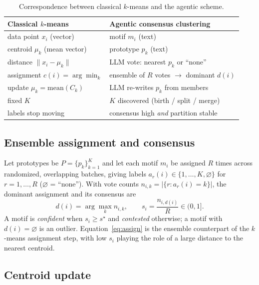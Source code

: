 \begin{table}[t]
\centering
\caption{Correspondence between classical $k$-means and the agentic scheme.}
\label{tab:kmeans}
\begin{tabular}{@{}ll@{}}
\toprule
Classical $k$-means & Agentic consensus clustering \\
\midrule
data point $x_i$ (vector)            & motif $m_i$ (text) \\
centroid $\mu_k$ (mean vector)       & prototype $p_k$ (text) \\
distance $\lVert x_i-\mu_k\rVert$    & LLM vote: nearest $p_k$ or ``none'' \\
assignment $c(i)=\arg\min_k$         & ensemble of $R$ votes $\to$ dominant $d(i)$ \\
update $\mu_k=\mathrm{mean}(C_k)$    & LLM re-writes $p_k$ from members \\
fixed $K$                            & $K$ discovered (birth / split / merge) \\
labels stop moving                   & consensus high \emph{and} partition stable \\
\bottomrule
\end{tabular}
\end{table}

\subsection{Ensemble assignment and consensus}

Let prototypes be $P=\{p_k\}_{k=1}^{K}$ and let each motif $m_i$ be assigned $R$
times across randomized, overlapping batches, giving labels
$a_r(i)\in\{1,\dots,K,\varnothing\}$ for $r=1,\dots,R$ ($\varnothing$ = ``none'').
With vote counts $n_{i,k}=\lvert\{r:a_r(i)=k\}\rvert$, the dominant assignment and
its consensus are
\begin{equation}
d(i)=\arg\max_{k} n_{i,k},
\qquad
s_i=\frac{n_{i,d(i)}}{R}\in(0,1].
\label{eq:assign}
\end{equation}
A motif is \emph{confident} when $s_i\ge s^\star$ and \emph{contested} otherwise;
a motif with $d(i)=\varnothing$ is an outlier. Equation~\eqref{eq:assign} is the
ensemble counterpart of the $k$-means assignment step, with low $s_i$ playing the
role of a large distance to the nearest centroid.

\subsection{Centroid update}

